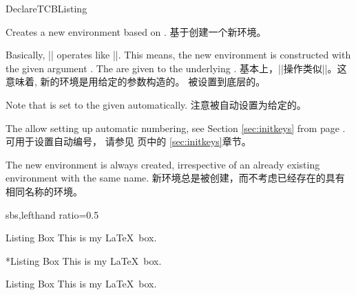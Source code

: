 \begin{docCommand}{DeclareTCBListing}{}
  
\begin{stripedbox}
Creates a new environment  based on .
\tcblower
基于创建一个新环境。
\end{stripedbox}


\begin{stripedbox}
Basically, |\DeclareTCBListing| operates like |\DeclareDocumentEnvironment|. This means,
the new environment  is constructed with the given argument .
The  are given to the underlying .
\tcblower
基本上，|\DeclareTCBListing|操作类似|\DeclareDocumentEnvironment|。这意味着,
新的环境是用给定的参数构造的。
被设置到底层的。
\end{stripedbox}


\begin{stripedbox}
Note that  is set to the given 
automatically.
\tcblower
注意被自动设置为给定的。
\end{stripedbox}

\begin{stripedbox}
The  allow setting up automatic numbering,
see Section \ref{sec:initkeys} from page \pageref{sec:initkeys}.
\tcblower
{}可用于设置自动编号，%
请参见 \pageref{sec:initkeys} 页中的 \ref{sec:initkeys}章节。
\end{stripedbox}

\begin{stripedbox}
The new environment is always created, irrespective of an already existing
environment with the same name.
\tcblower
新环境总是被创建，而不考虑已经存在的具有相同名称的环境。
\end{stripedbox}

\begin{dispExample*}{sbs,lefthand ratio=0.5}

\begin{mybox}{Listing Box}
This is my
\LaTeX\ box.
\end{mybox}
\bigskip

\begin{mybox}*{Listing Box}
This is my
\LaTeX\ box.
\end{mybox}
\bigskip

\begin{mybox}[colback=yellow]
  {Listing Box}
This is my
\LaTeX\ box.
\end{mybox}
\end{dispExample*}
\end{docCommand}

